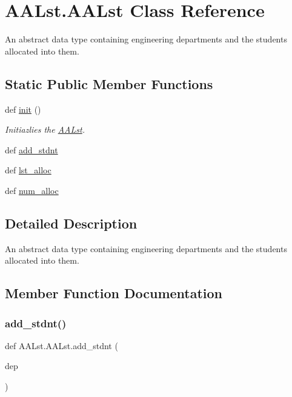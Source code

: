 \hypertarget{class_a_a_lst_1_1_a_a_lst}{}\section{A\+A\+Lst.\+A\+A\+Lst Class Reference}
\label{class_a_a_lst_1_1_a_a_lst}


An abstract data type containing engineering departments and the students allocated into them.  


\subsection*{Static Public Member Functions}
\begin{DoxyCompactItemize}
\item 
def \hyperlink{class_a_a_lst_1_1_a_a_lst_ade2ae95f7a0e7ad568b8fdcccdc18556}{init} ()
\begin{DoxyCompactList}\small\item\em Initiazlies the \hyperlink{class_a_a_lst_1_1_a_a_lst}{A\+A\+Lst}. \end{DoxyCompactList}\item 
def \hyperlink{class_a_a_lst_1_1_a_a_lst_ac43ad5933af821d0763f532a50d83745}{add\+\_\+stdnt}
\item 
def \hyperlink{class_a_a_lst_1_1_a_a_lst_ab3b9d7b152fbc79215fc572b253ce239}{lst\+\_\+alloc}
\item 
def \hyperlink{class_a_a_lst_1_1_a_a_lst_adc3cda4fa36f60abdf614964290b98f9}{num\+\_\+alloc}
\end{DoxyCompactItemize}


\subsection{Detailed Description}
An abstract data type containing engineering departments and the students allocated into them. 

\subsection{Member Function Documentation}
\mbox{\label{class_a_a_lst_1_1_a_a_lst_ac43ad5933af821d0763f532a50d83745}} 
\subsubsection{\texorpdfstring{add\+\_\+stdnt()}{add\_stdnt()}}
{\footnotesize\ttfamily def A\+A\+Lst.\+A\+A\+Lst.\+add\+\_\+stdnt (\begin{DoxyParamCaption}\item[{}]{dep }\end{DoxyParamCaption})\hspace{0.3cm}{\ttfamily [static]}}

